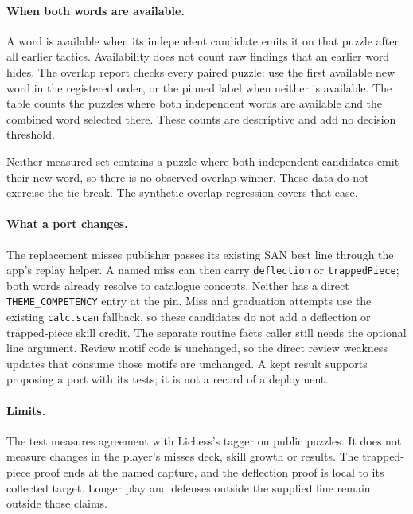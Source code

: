 \documentclass[11pt]{article}
\begin{document}
\begin{table}[htbp]
\centering
\small
\RTwoCombinedTable
\caption{Combined-minus-pinned changes in percentage points, with
\RTwoConfidence\% paired bootstrap intervals, under the unchanged rule.}
\end{table}

\paragraph{When both words are available.} A word is available when its
independent candidate emits it on that puzzle after all earlier tactics.
Availability does not count raw findings that an earlier word hides. The
overlap report checks every paired puzzle: use the first available new word
in the registered order, or the pinned label when neither is available.
The table counts the puzzles where both independent words are available and
the combined word selected there. These counts are descriptive and add no
decision threshold.

Neither measured set contains a puzzle where both independent candidates emit
their new word, so there is no observed overlap winner. These data do not
exercise the tie-break. The synthetic overlap regression covers that case.

\begin{table}[htbp]
\centering
\small
\RTwoOverlap
\caption{Overlap of the independent new words and the combined selection.
The registered order is trapped piece before deflection.}
\end{table}

\paragraph{What a port changes.} The replacement misses publisher passes its
existing SAN best line through the app's replay helper. A named miss can then
carry \texttt{deflection} or \texttt{trappedPiece}; both words already resolve to
catalogue concepts. Neither has a direct \texttt{THEME\_COMPETENCY} entry at the
pin. Miss and graduation attempts use the existing \texttt{calc.scan} fallback,
so these candidates do not add a deflection or trapped-piece skill credit.
The separate routine facts caller still needs the optional line argument.
Review motif code is unchanged, so the direct review weakness updates that
consume those motifs are unchanged. A kept result supports proposing a port
with its tests; it is not a record of a deployment.

\paragraph{Limits.} The test measures agreement with Lichess's tagger on public
puzzles. It does not measure changes in the player's misses deck, skill growth
or results. The trapped-piece proof ends at the named capture, and the
deflection proof is local to its collected target. Longer play and defenses
outside the supplied line remain outside those claims.
\end{document}
